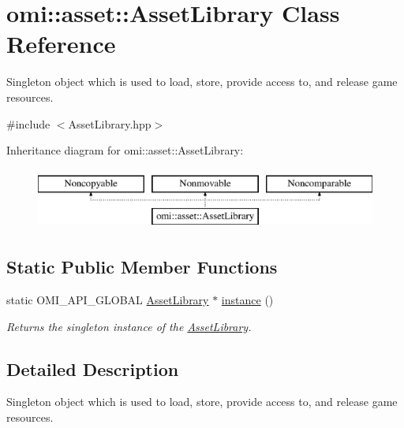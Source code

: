 \hypertarget{classomi_1_1asset_1_1_asset_library}{}\section{omi\+:\+:asset\+:\+:Asset\+Library Class Reference}
\label{classomi_1_1asset_1_1_asset_library}


Singleton object which is used to load, store, provide access to, and release game resources.  




{\ttfamily \#include $<$Asset\+Library.\+hpp$>$}

Inheritance diagram for omi\+:\+:asset\+:\+:Asset\+Library\+:\begin{figure}[H]
\begin{center}
\leavevmode
\includegraphics[height=2.000000cm]{classomi_1_1asset_1_1_asset_library}
\end{center}
\end{figure}
\subsection*{Static Public Member Functions}
\begin{DoxyCompactItemize}
\item 
static O\+M\+I\+\_\+\+A\+P\+I\+\_\+\+G\+L\+O\+B\+AL \hyperlink{classomi_1_1asset_1_1_asset_library}{Asset\+Library} $\ast$ \hyperlink{classomi_1_1asset_1_1_asset_library_a919ee8b0e034d68df7c333db4b274093}{instance} ()\hypertarget{classomi_1_1asset_1_1_asset_library_a919ee8b0e034d68df7c333db4b274093}{}\label{classomi_1_1asset_1_1_asset_library_a919ee8b0e034d68df7c333db4b274093}

\begin{DoxyCompactList}\small\item\em Returns the singleton instance of the \hyperlink{classomi_1_1asset_1_1_asset_library}{Asset\+Library}. \end{DoxyCompactList}\end{DoxyCompactItemize}


\subsection{Detailed Description}
Singleton object which is used to load, store, provide access to, and release game resources. 

